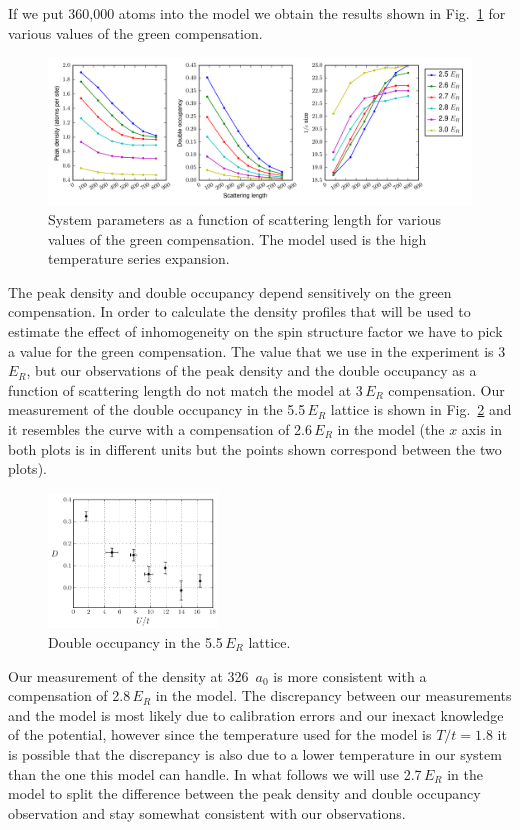 \documentclass[11pt,letter]{article}
\begin{document}
If we put 360,000 atoms into the model we obtain the results shown in
Fig.~\ref{fig:thermo-green} for various values of the green compensation.  
\begin{figure}
\centering 
\includegraphics[width=\textwidth]{figures_140129/GR.png}
\caption[System parameters in the thermodynamic model]{\small 
System parameters as a function of scattering length for various values of the
green compensation.  The model used is the high temperature series expansion. }
\label{fig:thermo-green} 
\end{figure} 
The peak density and double occupancy depend sensitively on the green
compensation.  In order to calculate the density profiles that will be used to
estimate the effect of inhomogeneity on the spin structure factor we have to
pick a value for the green compensation.  The value that we use in the
experiment is 3\,$E_{R}$, but our observations of the peak density and the
double occupancy as a function of scattering length do not match the model at
3\,$E_{R}$ compensation.  Our measurement of the double occupancy in the
5.5\,$E_{R}$ lattice is shown in Fig.~\ref{fig:docc-5.5} and it resembles the
curve with a compensation of 2.6\,$E_{R}$ in the model (the $x$ axis in both
plots is in different units but the points shown correspond between the two
plots).  
\begin{figure}
\centering 
\includegraphics[width=0.4\textwidth]{figures_140129/docc_average.png}
\caption[Double occupancy]{\small 
Double occupancy in the 5.5\,$E_{R}$ lattice. }
\label{fig:docc-5.5} 
\end{figure} 
 Our measurement of the
density at 326~$a_{0}$ is more consistent with 	a compensation of 2.8\,$E_{R}$
in the model.   The discrepancy between our measurements and the model is most
likely due to calibration errors and our inexact knowledge of the potential,
however since the temperature used for the model is $T/t = 1.8$ it is possible
that the discrepancy is also  due to a lower temperature in our system  than
the one this model can handle.   In what follows we will use 2.7\,$E_{R}$ in
the model to split the difference between the peak density and double occupancy
observation and stay somewhat consistent with our observations.  
\end{document}
